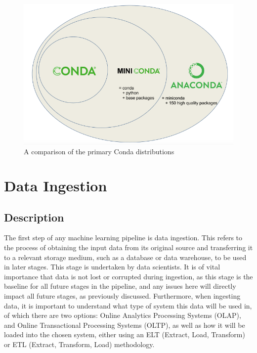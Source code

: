\documentclass[12pt]{report}
\begin{document}
\begin{figure}[H]
    \centering
    \includegraphics[width=.75\linewidth]{miniconda.png}
    \caption{A comparison of the primary Conda distributions \autocite{towardsdatascience_getting_2021}}
    \label{fig:Miniconda}
\end{figure}

\pagebreak

\section{Data Ingestion}
\subsection{Description}
The first step of any machine learning pipeline is data ingestion. This refers to the process of obtaining the input data from its original source
and transferring it to a relevant storage medium, such as a database or data warehouse, to be used in later stages. This stage 
is undertaken by data scientists. 
It is of vital importance that data is not lost or corrupted during ingestion, as this stage is the baseline for all future stages in the pipeline, and any issues
here will directly impact all future stages, as previously discussed. Furthermore, when ingesting data, it is important to understand what type of system this data 
will be used in, of which there are two options: Online Analytics Processing Systems (OLAP), and Online Transactional Processing Systems (OLTP), as well 
as how it will be loaded into the chosen system, either using an ELT (Extract, Load, Transform) or ETL (Extract, Transform, Load) methodology.
\end{document}
